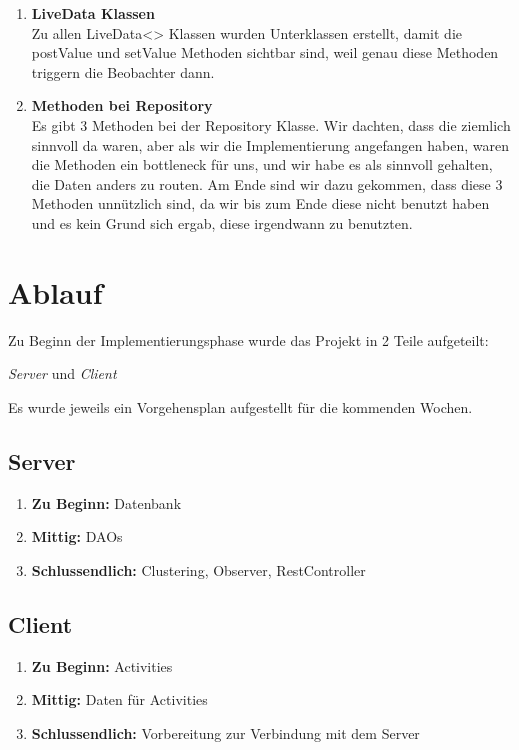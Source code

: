 \documentclass[11pt,a4paper]{scrartcl}
\begin{document}
\begin{enumerate}
\item \textbf{LiveData Klassen}\\
Zu allen LiveData<> Klassen wurden Unterklassen erstellt, damit die postValue und setValue Methoden sichtbar sind, weil genau diese Methoden triggern die Beobachter dann.

\item \textbf{Methoden bei Repository}\\
Es gibt 3 Methoden bei der Repository Klasse. Wir dachten, dass die ziemlich sinnvoll da waren, aber als wir die Implementierung angefangen haben, waren die Methoden ein bottleneck für uns, und wir habe es als sinnvoll gehalten, die Daten anders zu routen. Am Ende sind wir dazu gekommen, dass diese 3 Methoden unnützlich sind, da wir bis zum Ende diese nicht benutzt haben und es kein Grund sich ergab, diese irgendwann zu benutzten.
	
\end{enumerate}

\newpage

\section{Ablauf}

Zu Beginn der Implementierungsphase wurde das Projekt in 2 Teile aufgeteilt:

\textit{Server} und \textit{Client}

Es wurde jeweils ein Vorgehensplan aufgestellt für die kommenden Wochen.

\subsection{Server}

\begin{enumerate}
	\item \textbf{Zu Beginn:} Datenbank
	
	\item \textbf{Mittig:} DAOs
	
	\item \textbf{Schlussendlich:} Clustering, Observer, RestController
	
\end{enumerate}

\subsection{Client}
\begin{enumerate}
	\item \textbf{Zu Beginn:} Activities 

	\item \textbf{Mittig:} Daten für Activities

	\item \textbf{Schlussendlich:} Vorbereitung zur Verbindung mit dem Server
\end{enumerate}
\end{document}
